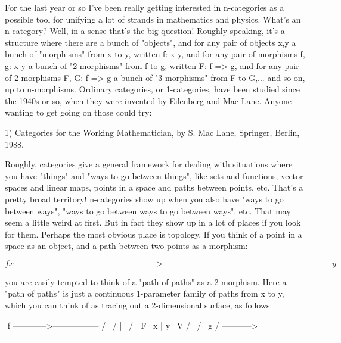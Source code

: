 

For the last year or so I've been really getting interested in
n-categories as a possible tool for unifying a lot of strands
in mathematics and physics.  What's an n-category?  Well, in a
sense that's the big question!  Roughly speaking, it's a structure
where there are a bunch of "objects", and for any pair of objects x,y 
a bunch of "morphisms" from x to y, written f: x \to  y, and for
any pair of morphisms f, g: x \to  y a bunch of "2-morphisms"
from f to g, written F: f => g, and for any pair of 2-morphisms
F, G: f => g a bunch of "3-morphisms" from F to G,... and so on,
up to n-morphisms.  Ordinary categories, or 1-categories, have
been studied since the 1940s or so, when they were invented by 
Eilenberg and Mac Lane.  Anyone wanting to get going on those could try:

1) Categories for the Working Mathematician, by S. Mac Lane,
Springer, Berlin, 1988.

Roughly, categories give a general framework for
dealing with situations where you have "things" and "ways to
go between things", like sets and functions, vector spaces
and linear maps, points in a space and paths between points, etc.
That's a pretty broad territory!  n-categories show up when you
also have "ways to go between ways", "ways to go between ways
to go between ways", etc.  That may seem a little weird at first.
But in fact they show up in a lot of places if you look for them.
Perhaps the most obvious place is topology.  If you think of a
point in a space as an object, and a path between two points as
a morphism:


$$
                            f
         x ----------------->-------------------- y
$$
    
you are easily tempted to think of a "path of paths" as a 2-morphism.
Here a "path of paths" is just a continuous 1-parameter family of
paths from x to y, which you can think of as tracing out a 2-dimensional
surface, as follows:

$$
                          f
             ------------>-----------------
           /                                \
          /              |                   \
         /               | F                  \
        x                |                     y
         \               V                    /
          \                                  /
           \             g                  /
             ----------->------------------  

